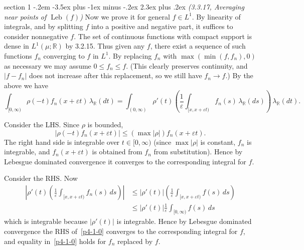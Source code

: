 \documentclass[12pt]{article}
\makeatletter
\theoremstyle{norm}
\newcommand{\R}[0]{\mathbb{R}}
\newcommand{\rc}[1]{\frac{1}{#1}}
\newcommand{\ep}[0]{\varepsilon}
\newcommand{\la}[0]{\lambda}
\newcommand{\rh}[0]{\rho}
\newcommand{\ab}[1]{\left| {#1} \right|}
\newcommand{\pa}[1]{\left( {#1} \right)}
\newcommand{\Leb}[0]{\operatorname{Leb}}
\newcommand{\iy}[0]{\infty}
\newenvironment{problem}{\@startsection
       {section}
       {1}
       {-.2em}
       {-3.5ex plus -1ex minus -.2ex}
       {2.3ex plus .2ex}
       {\pagebreak[3]%
       \large\bf\noindent{Problem }
       }
       }
       {%
       }
\makeatother
\begin{document}
\begin{problem}{\it (3.3.17, Averaging near points of $\Leb(f)$)}
Now we prove it for general $f\in L^1$. By linearity of integrals, and by splitting $f$ into a positive and negative part, it suffices to consider nonnegative $f$. 
The set of continuous functions with compact support is dense in $L^1(\mu;\R)$ by 3.2.15. 
Thus given any $f$, there exist a sequence of such functions $f_n$ converging to $f$ in $L^1$. 
By replacing $f_n$ with $\max(\min(f,f_n),0)$ as necessary we may assume $0\le f_n\le f$. (This clearly preserves continuity, and $|f-f_n|$ does not increase after this replacement, so we still have $f_n\to f$.) 
By the above we have
\begin{equation}\label{p4-1-0}
\int_{[0,\iy)} \rh(-t)f_n(x+\ep t) \,\la_{\R}(dt) =\int_{(0,\iy)} \rh'(t)\pa{\rc{\ep}\int_{[x,x+\ep t)}f_n(s)\,\la_{\R}(ds)}\,\la_{\R}(dt).
\end{equation}

Consider the LHS. Since $\rh$ is bounded,
\[
|\rh(-t)f_n(x+\ep t)|\le (\max |\rho|)f_n(x+\ep t).
\]
The right hand side is integrable over $t\in [0,\iy)$ (since $\max |\rho|$ is constant, $f_n$ is integrable, and $f_n(x+\ep t)$ is obtained from $f_n$ from substitution). Hence by Lebesgue dominated convergence it converges to the corresponding integral for $f$.

Consider the RHS. Now
\begin{align*}
\ab{\rh'(t)\pa{\rc{\ep}\int_{[x,x+\ep t)}f_n(s)\,ds}}
&\le |\rh'(t)|\pa{\rc{\ep}\int_{[x,x+\ep t)}f(s)\,ds}\\
&\le |\rh'(t)|\rc{\ep}\int_{[0,\iy)}f(s)\,ds
\end{align*}
which is integrable because $|\rh'(t)|$ is integrable. Hence by Lebesgue dominated convergence the RHS of~\ref{p4-1-0} converges to the corresponding integral for $f$, and equality in~\ref{p4-1-0} holds for $f_n$ replaced by $f$.\\


\end{problem}
\end{document}
